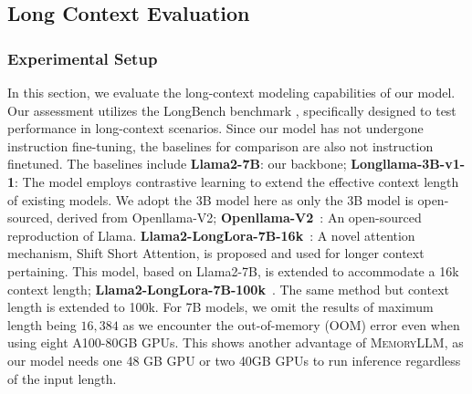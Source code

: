 \documentclass{article}
\theoremstyle{plain}
\theoremstyle{definition}
\theoremstyle{remark}
\newcommand{\ours}{\textsc{MemoryLLM}\xspace}
\begin{document}
\vspace{-5pt}
\subsection{Long Context Evaluation}
\label{sub:long_context_evaluation}
\vspace{-2pt}
\subsubsection{Experimental Setup}
In this section, we evaluate the long-context modeling capabilities of our model. Our assessment utilizes the LongBench benchmark \citep{longbench}, specifically designed to test performance in long-context scenarios. 
Since our model has not undergone instruction fine-tuning, the baselines for comparison are also not instruction finetuned. The baselines include \textbf{Llama2-7B}: our backbone; \textbf{Longllama-3B-v1-1}\citep{fot}: The model employs contrastive learning to extend the effective context length of existing models. We adopt the 3B model here as only the 3B model is open-sourced, derived from Openllama-V2; \textbf{Openllama-V2}~\citep{openlm2023openllama}: An open-sourced reproduction of Llama. \textbf{Llama2-LongLora-7B-16k}~\citep{longlora}: A novel attention mechanism, Shift Short Attention, is proposed and used for longer context pertaining. This model, based on Llama2-7B, is extended to accommodate a 16k context length; 
\textbf{Llama2-LongLora-7B-100k}~\citep{longlora}. The same method but context length is extended to 100k. 
For 7B models, we omit the results of maximum length being $16,384$ as we encounter the out-of-memory (OOM) error even when using eight A100-80GB GPUs. This shows another advantage of \ours, as our model needs one 48 GB GPU or two 40GB GPUs to run inference regardless of the input length.

\vspace{-5pt}
\end{document}
